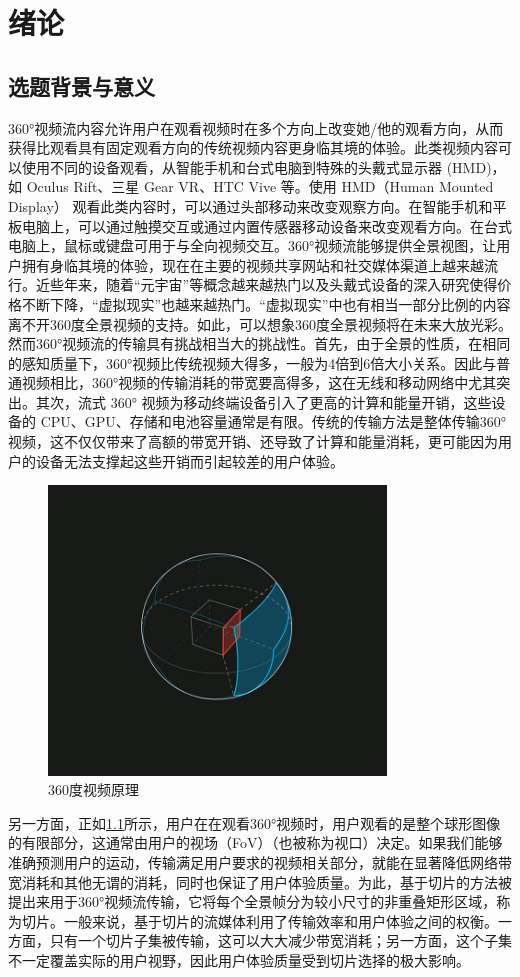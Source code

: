 \chapter{绪论}
\label{cha:introduction}
\section{选题背景与意义}

360°视频流内容允许用户在观看视频时在多个方向上改变她/他的观看方向，从而获得比观看具有固定观看方向的传统视频内容更身临其境的体验。此类视频内容可以使用不同的设备观看，从智能手机和台式电脑到特殊的头戴式显示器 (HMD)，如 Oculus Rift、三星 Gear VR、HTC Vive 等。使用 HMD（Human Mounted Display） 观看此类内容时，可以通过头部移动来改变观察方向。在智能手机和平板电脑上，可以通过触摸交互或通过内置传感器移动设备来改变观看方向。在台式电脑上，鼠标或键盘可用于与全向视频交互。360°视频流能够提供全景视图，让用户拥有身临其境的体验，现在在主要的视频共享网站和社交媒体渠道上越来越流行。近些年来，随着“元宇宙”等概念越来越热门以及头戴式设备的深入研究使得价格不断下降，“虚拟现实”也越来越热门。“虚拟现实”中也有相当一部分比例的内容离不开360度全景视频的支持。如此，可以想象360度全景视频将在未来大放光彩。然而360°视频流的传输具有挑战相当大的挑战性。首先，由于全景的性质，在相同的感知质量下，360°视频比传统视频大得多，一般为4倍到6倍大小关系\cite{ref1}。因此与普通视频相比，360°视频的传输消耗的带宽要高得多，这在无线和移动网络中尤其突出。其次，流式 360° 视频为移动终端设备引入了更高的计算和能量开销，这些设备的 CPU、GPU、存储和电池容量通常是有限。传统的传输方法是整体传输360°视频，这不仅仅带来了高额的带宽开销、还导致了计算和能量消耗，更可能因为用户的设备无法支撑起这些开销而引起较差的用户体验。
\begin{figure}[h]
	\centering
	\includegraphics[width=0.8\textwidth]{figure/原理.jpg}
	\caption{360度视频原理}
	\label{fig原理}
\end{figure}
另一方面，正如\ref{fig原理}所示，用户在在观看360°视频时，用户观看的是整个球形图像的有限部分，这通常由用户的视场（FoV）（也被称为视口）决定。如果我们能够准确预测用户的运动，传输满足用户要求的视频相关部分，就能在显著降低网络带宽消耗和其他无谓的消耗，同时也保证了用户体验质量。为此，基于切片的方法被提出来用于360°视频流传输，它将每个全景帧分为较小尺寸的非重叠矩形区域，称为切片。一般来说，基于切片的流媒体利用了传输效率和用户体验之间的权衡。一方面，只有一个切片子集被传输，这可以大大减少带宽消耗；另一方面，这个子集不一定覆盖实际的用户视野，因此用户体验质量受到切片选择的极大影响。

